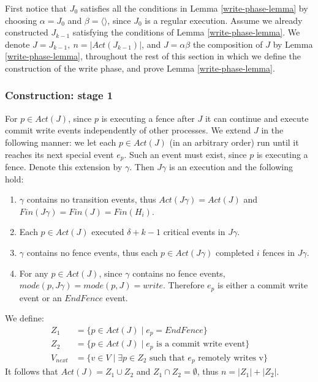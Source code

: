 First notice that $J_0$ satisfies all the conditions in Lemma \ref{write-phase-lemma} by choosing $\alpha = J_0$ and $\beta = \langle \rangle$, since $J_0$ is a regular execution. Assume we already constructed $J_{k-1}$ satisfying the conditions of Lemma \ref{write-phase-lemma}. We denote $J=J_{k-1},\ n=|Act(J_{k-1})|$, and $J = \alpha \beta$ the composition of $J$ by Lemma \ref{write-phase-lemma}, throughout the rest of this section in which we define the construction of the write phase, and prove Lemma \ref{write-phase-lemma}.

\subsubsection{Construction: stage 1}
For $p \in Act(J)$, since $p$ is executing a fence after $J$ it can continue and execute commit write events independently of other processes. We extend $J$ in the following manner: we let each $p \in Act(J)$ (in an arbitrary order) run until it reaches its next special event $e_p$. Such an event must exist, since $p$ is executing a fence. Denote this extension by $\gamma$. Then $J \gamma$ is an execution and the following hold:
\begin{enumerate}
	\item $\gamma$ contains no transition events, thus $Act(J \gamma) = Act(J)$ and $Fin(J \gamma) = Fin(J) = Fin(H_i)$.
	\item Each $p \in Act(J)$ executed $\delta+k-1$ critical events in $J \gamma$.
	\item $\gamma$ contains no fence events, thus each $p \in Act(J \gamma)$ completed $i$ fences in $J \gamma$.
	\item For any $p \in Act(J)$, since $\gamma$ contains no fence events, $mode(p,J \gamma) = mode(p,J) = write$. Therefore $e_p$ is either a commit write event or an $EndFence$ event.
	
\end{enumerate}

We define:
\begin{align*}
Z_1 &= \{p \in Act(J) \mid e_p = EndFence\} \\
Z_2 &= \{p \in Act(J) \mid e_p \text{ is a commit write event}\} \\
V_{next} &= \{v \in V \mid \exists p \in Z_2 \text{ such that } e_p \text{ remotely writes v}\}
\end{align*}
It follows that $Act(J) = Z_1 \cup Z_2$ and $Z_1 \cap Z_2 = \emptyset$, thus $n = |Z_1|+|Z_2|$.


